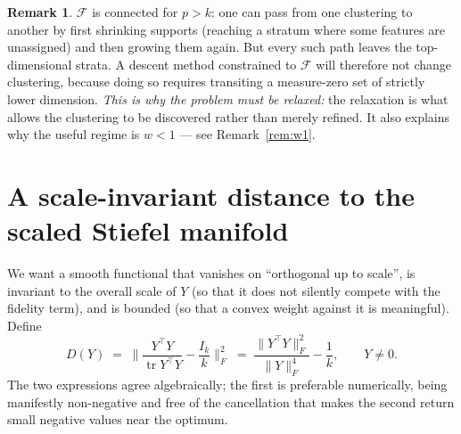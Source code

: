 \documentclass[11pt]{article}
\theoremstyle{definition}
\newtheorem{remark}[proposition]{Remark}
\DeclareMathOperator{\tr}{tr}
\newcommand{\Fnorm}[1]{\lVert #1 \rVert_F}
\begin{document}
\begin{remark}\label{rem:whyrelax}
$\mathcal{F}$ is connected for $p>k$: one can pass from one clustering to
another by first shrinking supports (reaching a stratum where some features are
unassigned) and then growing them again. But every such path leaves the
top-dimensional strata. A descent method constrained to $\mathcal{F}$ will
therefore not change clustering, because doing so requires transiting a
measure-zero set of strictly lower dimension. \emph{This is why the problem must
be relaxed:} the relaxation is what allows the clustering to be discovered
rather than merely refined. It also explains why the useful regime is $w<1$ ---
see Remark~\ref{rem:w1}.
\end{remark}

\section{A scale-invariant distance to the scaled Stiefel manifold}
\label{sec:functional}

We want a smooth functional that vanishes on ``orthogonal up to scale'', is
invariant to the overall scale of $Y$ (so that it does not silently compete with
the fidelity term), and is bounded (so that a convex weight against it is
meaningful). Define
\begin{equation}\label{eq:D}
  D(Y) \;=\; \Big\lVert \frac{Y^\top Y}{\tr Y^\top Y} - \frac{I_k}{k} \Big\rVert_F^2
       \;=\; \frac{\Fnorm{Y^\top Y}^2}{\Fnorm{Y}^4} - \frac{1}{k},
  \qquad Y \neq 0 .
\end{equation}
The two expressions agree algebraically; the first is preferable numerically,
being manifestly non-negative and free of the cancellation that makes the second
return small negative values near the optimum.
\end{document}
